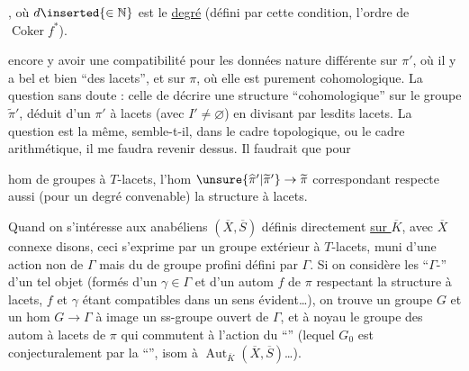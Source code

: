 

,
où $d\inserted{\in\mathbb N}$ est le \uline{degré} (défini  
par cette condition,
  l'ordre de $\operatorname{Coker}f^{*}$). 

 
encore y avoir une compatibilité
pour les données  
nature différente sur $\pi'$, où il y a bel et
bien ``des lacets'', et sur $\pi$, où elle est
purement cohomologique. \unsure{\S} La question
 sans doute : celle de décrire
une structure  ``cohomologique''
sur le groupe $\widetilde\pi'$, déduit d'un $\pi'$ à
lacets (avec $I'\ne\varnothing$) en divisant par
lesdits lacets. La question est la
même, semble-t-il, dans le cadre topologique,
ou le cadre arithmétique, il me faudra
revenir dessus. Il faudrait que pour 



hom  de groupes à $T$-lacets, l'hom
$\unsure{\widehat\pi'|\widetilde\pi'}\to\widetilde\pi$ correspondant respecte aussi (pour
un degré convenable) la structure à lacets.

Quand on s'intéresse aux  anabéliens
$(\overline X,\overline S)$ définis directement \uline{sur $\overline K$}, avec $\overline X$
connexe disons, ceci s'exprime
par un groupe extérieur à $T$-lacets,
muni d'une action non de $\Gamma$ mais
du \uline{} de groupe profini défini par $\Gamma$.
Si on considère les  ``$\Gamma$-'' d'un
tel objet (formés d'un $\gamma\in\Gamma$ et
d'un autom  $f$ de $\pi$ respectant la
structure à lacets, $f$ et $\gamma$ étant compatibles
dans un sens évident\dots), on trouve
un groupe  $G$ et un hom  $G\to\Gamma$
à image un ss-groupe ouvert de $\Gamma$, et
à noyau  le groupe des autom  à
lacets de $\pi$ qui commutent à l'action du
``''  (lequel $G_0$ est conjecturalement par la
``'', isom à  $\operatorname{Aut}_{\overline K}(\overline X,\overline S)$\dots).

